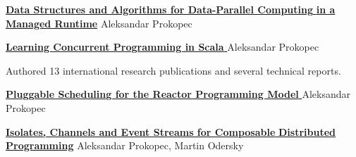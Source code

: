 \documentclass[9pt]{article}
\begin{document}



\medskip

\noindent\href{http://infoscience.epfl.ch/record/200977/files/EPFL_TH6264.pdf}
{\bf Data Structures and Algorithms for Data-Parallel Computing }
\newline
\noindent\href{http://infoscience.epfl.ch/record/200977/files/EPFL_TH6264.pdf}
{\bf in a Managed Runtime}
\newline
\noindent Aleksandar Prokopec
\bigskip


\medskip

\noindent\href{http://www.amazon.com/Learning-Concurrent-Programming-Aleksandar-Prokopec/dp/1783281413/}
{\bf Learning Concurrent Programming in Scala }
\newline
\noindent Aleksandar Prokopec
\bigskip




\noindent
Authored 13 international research publications
and several technical reports.
\newline


\noindent\href{Pluggable Scheduling for the Reactor Programming Model}
{\bf Pluggable Scheduling for the Reactor Programming Model }
\newline
\noindent Aleksandar Prokopec
\newline
{}
\bigskip


\noindent\href{http://axel22.github.io/resources/docs/reactors.pdf}
{\bf Isolates, Channels and Event Streams for Composable }
\newline
\noindent\href{http://axel22.github.io/resources/docs/reactive-isolates.pdf}
{\bf Distributed Programming}
\dates{}
\newline\noindent Aleksandar Prokopec, Martin Odersky
\newline
{}
\medskip
\end{document}

